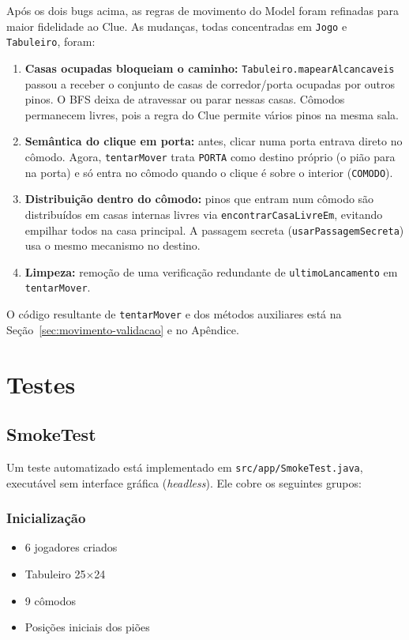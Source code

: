 \documentclass[12pt,a4paper]{report}
\begin{document}
Após os dois bugs acima, as regras de movimento do Model foram refinadas para maior fidelidade ao Clue. As mudanças, todas concentradas em \texttt{Jogo} e \texttt{Tabuleiro}, foram:

\begin{enumerate}
    \item \textbf{Casas ocupadas bloqueiam o caminho:} \texttt{Tabuleiro.mapearAlcancaveis} passou a receber o conjunto de casas de corredor/porta ocupadas por outros pinos. O BFS deixa de atravessar ou parar nessas casas. Cômodos permanecem livres, pois a regra do Clue permite vários pinos na mesma sala.
    \item \textbf{Semântica do clique em porta:} antes, clicar numa porta entrava direto no cômodo. Agora, \texttt{tentarMover} trata \texttt{PORTA} como destino próprio (o pião para na porta) e só entra no cômodo quando o clique é sobre o interior (\texttt{COMODO}).
    \item \textbf{Distribuição dentro do cômodo:} pinos que entram num cômodo são distribuídos em casas internas livres via \texttt{encontrarCasaLivreEm}, evitando empilhar todos na casa principal. A passagem secreta (\texttt{usarPassagemSecreta}) usa o mesmo mecanismo no destino.
    \item \textbf{Limpeza:} remoção de uma verificação redundante de \texttt{ultimoLancamento} em \texttt{tentarMover}.
\end{enumerate}

O código resultante de \texttt{tentarMover} e dos métodos auxiliares está na Seção~\ref{sec:movimento-validacao} e no Apêndice.

\chapter{Testes}

\section{SmokeTest}

Um teste automatizado está implementado em \texttt{src/app/SmokeTest.java}, executável sem interface gráfica (\textit{headless}). Ele cobre os seguintes grupos:

\subsection{Inicialização}
\begin{itemize}
    \item 6 jogadores criados
    \item Tabuleiro 25×24
    \item 9 cômodos
    \item Posições iniciais dos piões
\end{itemize}
\end{document}
